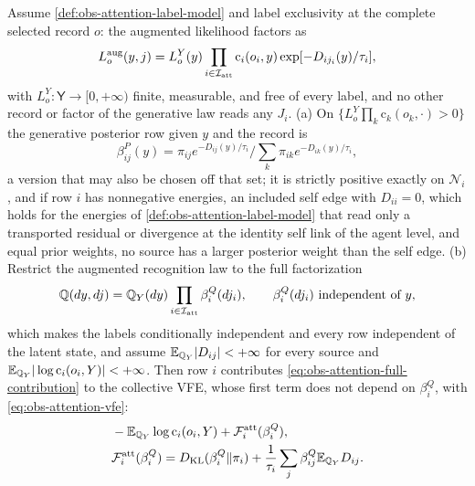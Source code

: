 Assume \cref{def:obs-attention-label-model} and label exclusivity at the
complete selected record \(o\): the augmented likelihood factors as
\begin{equation}
L_o^{\rm aug}(y,j)
=L_o^Y(y)\prod_{i\in\mathcal I_{\rm att}}
\mathrm c_i(o_i,y)\exp[-D_{ij_i}(y)/\tau_i],
\label{eq:obs-attention-augmented-likelihood}
\end{equation}
with \(L_o^Y:\mathsf Y\to[0,+\infty)\) finite, measurable, and free of every
label, and no other record or factor of the generative law reads any \(J_i\).
(a) On \(\{L_o^Y\prod_k\mathrm c_k(o_k,\cdot)>0\}\) the generative posterior
row given \(y\) and the record is
\begin{equation}
\beta^P_{ij}(y)
=\pi_{ij}e^{-D_{ij}(y)/\tau_i}\Big/\sum_k\pi_{ik}e^{-D_{ik}(y)/\tau_i},
\label{eq:obs-attention-posterior}
\end{equation}
a version that may also be chosen off that set; it is strictly positive
exactly on \(\mathcal N_i\), and if row \(i\) has nonnegative energies, an
included self edge with \(D_{ii}=0\), which holds for the energies of
\cref{def:obs-attention-label-model} that read only a transported residual or
divergence at the identity self link of the agent level, and equal prior
weights, no source has a
larger posterior weight than the self edge. (b) Restrict the augmented
recognition law to the full factorization
\begin{equation}
\mathbb Q(dy,dj)=\mathbb Q_Y(dy)
\prod_{i\in\mathcal I_{\rm att}}\beta_i^Q(dj_i),
\qquad \beta_i^Q(dj_i)\ \text{independent of }y,
\label{eq:obs-attention-recognition-factorization}
\end{equation}
which makes the labels conditionally independent and every row independent of
the latent state, and assume \(\mathbb E_{\mathbb Q_Y}|D_{ij}|<+\infty\) for every
source and \(\mathbb E_{\mathbb Q_Y}|\log\mathrm c_i(o_i,Y)|<+\infty\). Then row \(i\)
contributes \eqref{eq:obs-attention-full-contribution} to the collective VFE,
whose first term does not depend on \(\beta_i^Q\), with
\eqref{eq:obs-attention-vfe}:
\begin{align}
&-\mathbb E_{\mathbb Q_Y}\log\mathrm c_i(o_i,Y)+\mathcal F_i^{\rm att}(\beta_i^Q),
\label{eq:obs-attention-full-contribution}\\
&\mathcal F_i^{\rm att}(\beta^Q_i)
=D_{\mathrm{KL}}(\beta^Q_i\Vert\pi_i)
+\frac{1}{\tau_i}\sum_j\beta^Q_{ij}\mathbb E_{\mathbb Q_Y}D_{ij}.
\label{eq:obs-attention-vfe}
\end{align}
